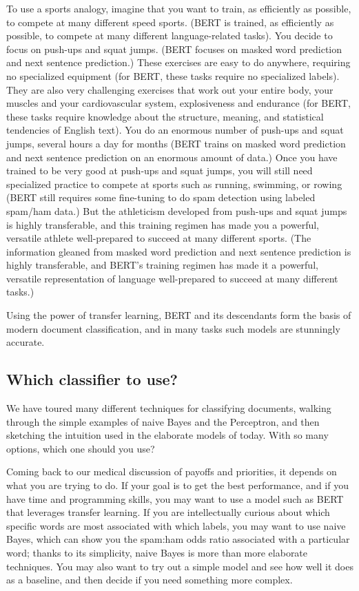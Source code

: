 To use a sports analogy,  imagine that you want to train, as  efficiently as possible, to compete at many different speed sports.  (BERT is trained, as efficiently as possible, to compete at many different language-related tasks). You decide to focus on push-ups and squat jumps.  (BERT focuses on masked word prediction and next sentence prediction.) These exercises are easy to do anywhere, requiring no  specialized equipment (for BERT, these tasks require no  specialized labels).   They are also very challenging exercises that work out your entire body, your muscles and your cardiovascular system, explosiveness and endurance (for BERT, these tasks require knowledge about the structure, meaning, and statistical tendencies of English text). You do an enormous number of push-ups and squat jumps,  several hours a day for months (BERT trains on masked word prediction and next sentence prediction on an enormous amount of data.)  Once you have trained to be very good at push-ups and squat jumps, you will still need specialized practice to compete at sports such as running, swimming, or rowing (BERT still requires some fine-tuning to do spam detection using labeled spam/ham data.)  But the athleticism developed from push-ups and squat jumps is highly transferable, and this training regimen has made you a powerful, versatile athlete well-prepared to succeed at many different sports.  (The information gleaned from masked word prediction and next sentence prediction is highly transferable, and BERT's training regimen has made it a powerful, versatile  representation of language well-prepared to succeed at many different tasks.)

Using the power of transfer learning, BERT and its descendants form the basis of modern document classification, and in many tasks such models are stunningly accurate.




\subsection{Which classifier to use?}

We have toured many different techniques for classifying documents, walking through the simple examples of naive Bayes and the Perceptron, and then sketching the intuition used in the elaborate models of today.  With so many options, which one should you use?

Coming back to our medical discussion of payoffs and priorities, it depends on what you are trying to do.  If your goal is to get the best performance, and if you have time and programming skills, you may want to use a model such as BERT that leverages transfer learning.  If you are intellectually curious  about which specific words are most associated with which labels, you may want to use naive Bayes, which can show you the spam:ham odds ratio associated with a particular word; thanks to its simplicity, naive Bayes is  more  than more elaborate techniques.  You may also want to try out a simple model and see how well it does as a baseline, and then decide if you need something more complex.

